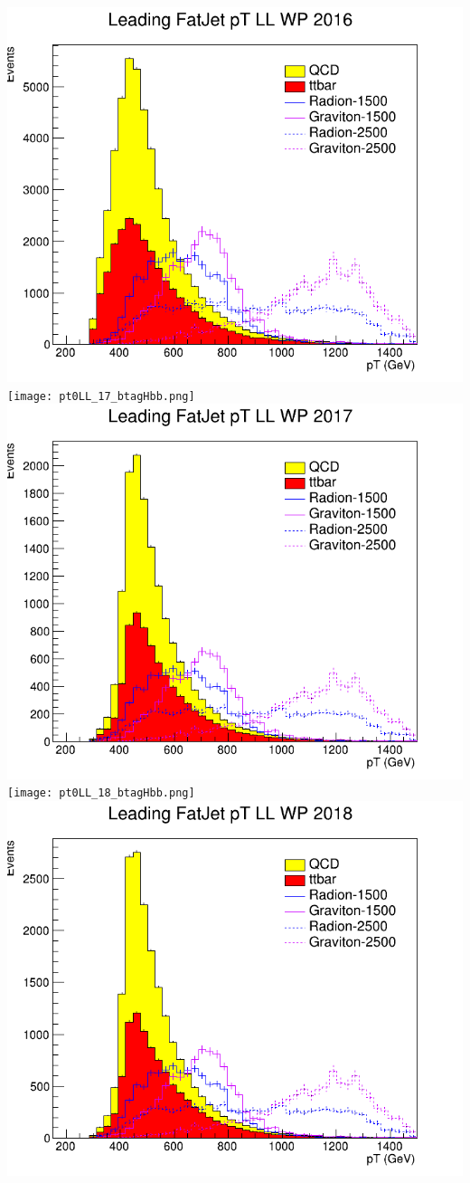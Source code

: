 \includegraphics[width=1\textwidth]{pt0LL_16_deepTagMD_HbbvsQCD.png}
\texttt{[image: pt0LL\_17\_btagHbb.png]}
\includegraphics[width=1\textwidth]{pt0LL_17_deepTagMD_HbbvsQCD.png}
\texttt{[image: pt0LL\_18\_btagHbb.png]}
\includegraphics[width=1\textwidth]{pt0LL_18_deepTagMD_HbbvsQCD.png}
